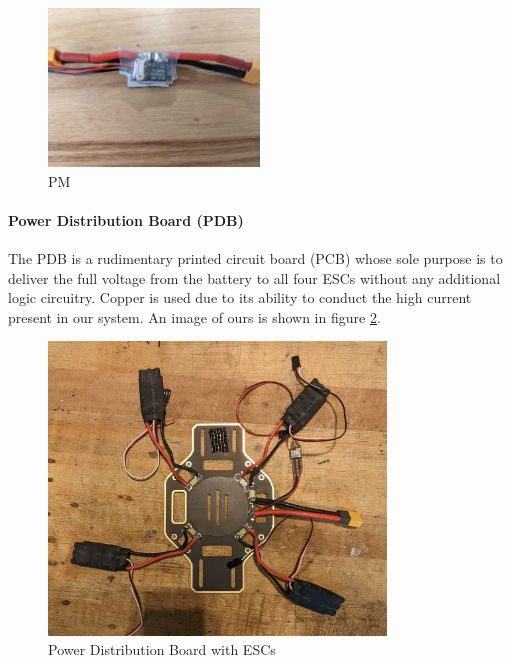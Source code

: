 \begin{figure}[H]
    \centering
    \includegraphics[width = 0.5\textwidth]{src/figs/PM.jpg}
    \caption{PM}
    \label{fig:pm}
\end{figure}


\paragraph{Power Distribution Board (PDB)}

The PDB is a rudimentary printed circuit board (PCB) whose sole purpose is to deliver the full voltage from the battery to all four ESCs without any additional logic circuitry. Copper is used due to its ability to conduct the high current present in our system. An image of ours is shown in figure \ref{fig:PDB}.

\begin{figure}[H]
    \centering
    \includegraphics[width=0.8\textwidth]{src/figs/PDB.jpg}
    \caption{Power Distribution Board with ESCs}
    \label{fig:PDB}
\end{figure}

